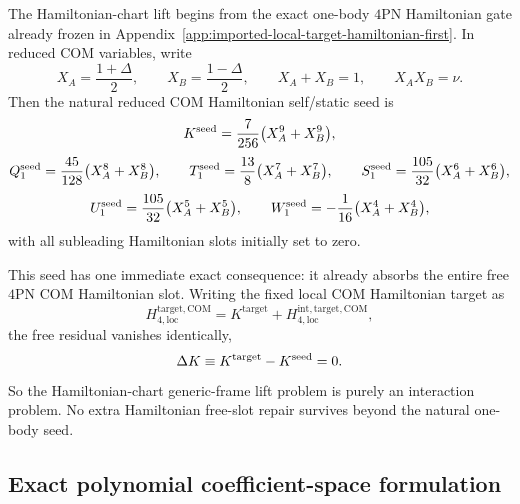 \documentclass[11pt]{article}
\begin{document}
The Hamiltonian-chart lift begins from the exact one-body $4$PN Hamiltonian
gate already frozen in
Appendix~\ref{app:imported-local-target-hamiltonian-first}.  In reduced COM
variables, write
\begin{equation}
X_A=\frac{1+\Delta}{2},
\qquad
X_B=\frac{1-\Delta}{2},
\qquad
X_A+X_B=1,
\qquad
X_AX_B=\nu.
\label{eq:app-4pn-hamiltonian-lift-XAXB}
\end{equation}
Then the natural reduced COM Hamiltonian self/static seed is
\begin{equation}
K^{\rm seed}=\frac{7}{256}\bigl(X_A^9+X_B^9\bigr),
\label{eq:app-4pn-hamiltonian-lift-Kseed}
\end{equation}
\begin{equation}
Q_1^{\rm seed}=\frac{45}{128}\bigl(X_A^8+X_B^8\bigr),
\qquad
T_1^{\rm seed}=\frac{13}{8}\bigl(X_A^7+X_B^7\bigr),
\qquad
S_1^{\rm seed}=\frac{105}{32}\bigl(X_A^6+X_B^6\bigr),
\label{eq:app-4pn-hamiltonian-lift-seed-QTS}
\end{equation}
\begin{equation}
U_1^{\rm seed}=\frac{105}{32}\bigl(X_A^5+X_B^5\bigr),
\qquad
W_1^{\rm seed}=-\frac{1}{16}\bigl(X_A^4+X_B^4\bigr),
\label{eq:app-4pn-hamiltonian-lift-seed-UW}
\end{equation}
with all subleading Hamiltonian slots initially set to zero.

This seed has one immediate exact consequence: it already absorbs the entire
free $4$PN COM Hamiltonian slot.  Writing the fixed local COM Hamiltonian target
as
\begin{equation}
H_{4,\mathrm{loc}}^{\mathrm{target,COM}}
=
K^{\mathrm{target}}
+
H_{4,\mathrm{loc}}^{\mathrm{int,target,COM}},
\label{eq:app-4pn-hamiltonian-lift-target-split}
\end{equation}
the free residual vanishes identically,
\begin{equation}
\Delta K
\equiv
K^{\mathrm{target}}-K^{\rm seed}
=
0.
\label{eq:app-4pn-hamiltonian-lift-DeltaK-zero}
\end{equation}
So the Hamiltonian-chart generic-frame lift problem is purely an interaction
problem.  No extra Hamiltonian free-slot repair survives beyond the natural
one-body seed.

\subsection{Exact polynomial coefficient-space formulation}
\label{app:hamiltonian-lift-coefficient-space}
\end{document}
